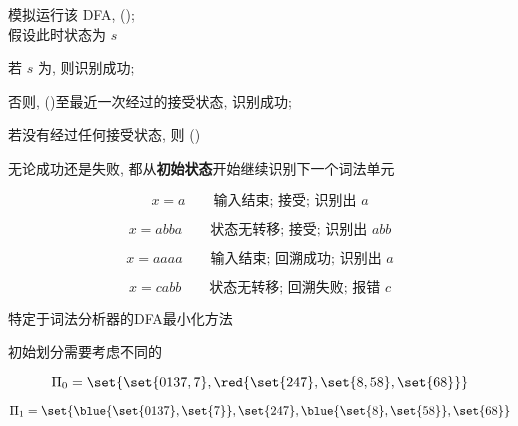 \begin{frame}{}
  \begin{center}
    模拟运行该 DFA,  (); \\[3pt]
    假设此时状态为 $s$


    \pause
    若 $s$ 为, 则识别成功;

    \vspace{0.30cm}
    否则,  ()至最近一次经过的接受状态, 识别成功;

    \vspace{0.30cm}
    若没有经过任何接受状态, 则 ()

    \vspace{0.30cm}
    无论成功还是失败, 都从{\bf 初始状态}开始继续识别下一个词法单元
  \end{center}
\end{frame}

\begin{frame}

  \[
    x = a \qquad \text{输入结束; 接受; 识别出 $a$}
  \]

  \pause
  \vspace{-0.40cm}
  \[
    x = abba \qquad \text{状态无转移; 接受; 识别出 $abb$}
  \]

  \pause
  \vspace{-0.40cm}
  \[
    x = aaaa \qquad \text{输入结束; 回溯成功; 识别出 $a$}
  \]

  \pause
  \vspace{-0.40cm}
  \[
    x = cabb \qquad \text{状态无转移; 回溯失败; 报错 $c$}
  \]
\end{frame}

\begin{frame}{}
  \begin{center}
    特定于词法分析器的DFA最小化方法


    \vspace{0.30cm}
    初始划分需要考虑不同的

    \vspace{-0.50cm}
    \[
      \Pi_{0} = \set{\set{0137, 7}, \red{\set{247}, \set{8, 58}, \set{68}}}
    \]

    \pause
    \vspace{-1.00cm}
    \[
      \Pi_{1} = \set{\blue{\set{0137}, \set{7}}, \set{247}, \blue{\set{8}, \set{58}}, 
        \set{68}}
    \]
  \end{center}
\end{frame}
